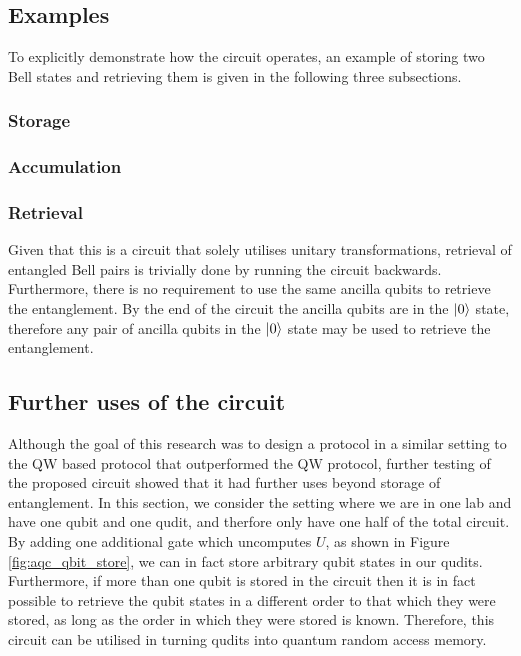 \subsection{Examples}
\label{subsection:examples}
To explicitly demonstrate how the circuit operates, an example of storing two Bell states and retrieving them is given in the following three subsections.
\subsubsection{Storage}
\label{subsubsection:aqcstorage}

\subsubsection{Accumulation}
\label{subsubsection:accumulation}

\subsubsection{Retrieval}
\label{subsubsection:aqcretrieval}
Given that this is a circuit that solely utilises unitary transformations, retrieval of entangled Bell pairs is trivially done by running the circuit backwards. Furthermore, there is no requirement to use the same ancilla qubits to retrieve the entanglement. By the end of the circuit the ancilla qubits are in the $\ket{0}$ state, therefore any pair of ancilla qubits in the $\ket{0}$ state may be used to retrieve the entanglement.

\subsection{Further uses of the circuit}
\label{subsection:furtheruses}
Although the goal of this research was to design a protocol in a similar setting to the QW based protocol that outperformed the QW protocol, further testing of the proposed circuit showed that it had further uses beyond storage of entanglement.
In this section, we consider the setting where we are in one lab and have one qubit and one qudit, and therfore only have one half of the total circuit.
By adding one additional gate which uncomputes $U$, as shown in Figure \ref{fig:aqc_qbit_store}, we can in fact store arbitrary qubit states in our qudits.
Furthermore, if more than one qubit is stored in the circuit then it is in fact possible to retrieve the qubit states in a different order to that which they were stored, as long as the order in which they were stored is known.
Therefore, this circuit can be utilised in turning qudits into quantum random access memory.

